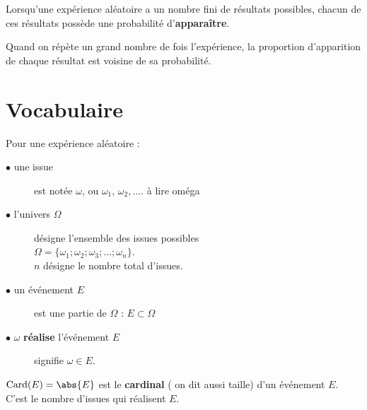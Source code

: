 \documentclass[main.tex]{subfiles}
\begin{document}
\begin{postulat} Lorsqu'une expérience aléatoire a un nombre fini de résultats possibles, chacun de ces résultats possède une probabilité d'\textbf{apparaître}.

Quand on répète un grand nombre de fois l'expérience, la proportion d'apparition de chaque résultat est voisine de sa probabilité.
\end{postulat}

% 
\section{Vocabulaire}

Pour une expérience aléatoire :
\begin{description}
	\item[$\bullet$ une issue] est notée  $\omega$, ou $\omega_1$, $\omega_2, \ldots$. à lire \og oméga \fg{}
	\item[$\bullet$ l'univers $\Omega$] désigne l'ensemble des issues possibles\\
	  $\Omega=\{ \omega_1; \omega_2; \omega_3;\ldots ;\omega_n\}$. \\
	$n$ désigne le nombre total d'issues.
	\item[$\bullet$ un événement $E$] est une partie de $\Omega$ : $E\subset \Omega$
	\item[$\bullet$  $\omega$ \textbf{réalise} l'événement $E$]  signifie $\omega\in E$. 
\end{description} 
\begin{mdframed}
	$\operatorname{Card}(E)=\abs{E}$ est le  \textbf{cardinal} ( on dit aussi taille) d'un événement $E$. C'est le nombre d'issues qui réalisent $E$. 
\end{mdframed} 
\end{document}
